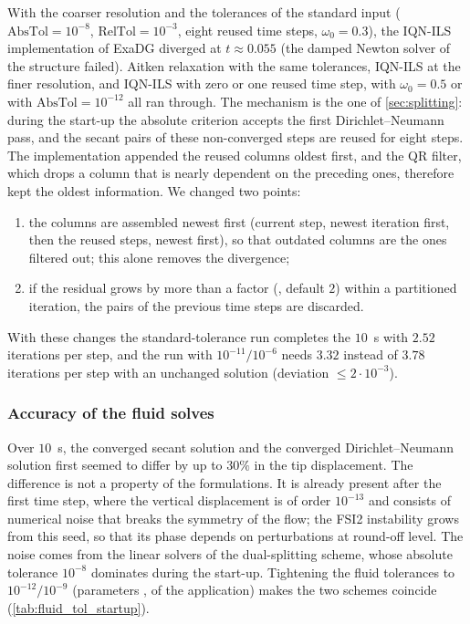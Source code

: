 \documentclass[11pt,a4paper]{article}
\theoremstyle{definition}
\theoremstyle{remark}
\begin{document}
With the coarser resolution and the tolerances of the standard input ($\mathrm{AbsTol}=10^{-8}$,
$\mathrm{RelTol}=10^{-3}$, eight reused time steps, $\omega_0=0.3$), the IQN-ILS implementation of
ExaDG diverged at $t\approx0.055$ (the damped Newton solver of the structure failed). Aitken
relaxation with the same tolerances, IQN-ILS at the finer resolution, and IQN-ILS with zero or one
reused time step, with $\omega_0=0.5$ or with $\mathrm{AbsTol}=10^{-12}$ all ran through. The
mechanism is the one of \cref{sec:splitting}: during the start-up the absolute criterion accepts
the first Dirichlet--Neumann pass, and the secant pairs of these non-converged steps are reused for
eight steps. The implementation appended the reused columns oldest first, and the QR filter, which
drops a column that is nearly dependent on the preceding ones, therefore kept the oldest
information. We changed two points:
\begin{enumerate}
\item the columns are assembled newest first (current step, newest iteration first, then the
reused steps, newest first), so that outdated columns are the ones filtered out; this alone removes
the divergence;
\item if the residual grows by more than a factor (, default $2$)
within a partitioned iteration, the pairs of the previous time steps are discarded.
\end{enumerate}
With these changes the standard-tolerance run completes the $10$~s with $2.52$ iterations per step,
and the run with $10^{-11}/10^{-6}$ needs $3.32$ instead of $3.78$ iterations per step with an
unchanged solution (deviation $\le2\cdot10^{-3}$).

\subsubsection{Accuracy of the fluid solves}\label{sec:fluid_accuracy}

Over $10$~s, the converged secant solution and the converged Dirichlet--Neumann solution first
seemed to differ by up to $30\%$ in the tip displacement. The difference is not a property of the
formulations. It is already present after the first time step, where the vertical displacement is
of order $10^{-13}$ and consists of numerical noise that breaks the symmetry of the flow; the FSI2
instability grows from this seed, so that its phase depends on perturbations at round-off level.
The noise comes from the linear solvers of the dual-splitting scheme, whose absolute tolerance
$10^{-8}$ dominates during the start-up. Tightening the fluid tolerances to $10^{-12}/10^{-9}$
(parameters ,  of the application) makes the two
schemes coincide (\cref{tab:fluid_tol_startup}).
\end{document}
